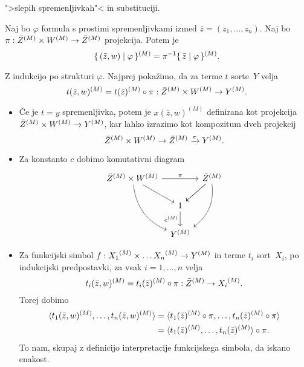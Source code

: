 \documentclass[../kategoricna_logika.tex]{subfiles}
\begin{document}
">slepih spremenljivkah"< in substituciji.
\begin{lema}\label{lema:slepe-spremenljivke}
  Naj bo $\varphi$ formula s prostimi spremenljivkami izmed
  $\bar{z} = (z_1, \ldots, z_n)$.  Naj bo
  $\pi : \bar{Z}^{(M)} \times W^{(M)} \to {\bar{Z}}^{(M)}$
  projekcija. Potem je
  $$\lbrace\,(\bar{z}, w)  \mid  \varphi\,\rbrace^{(M)} = \pi^{-1} \lbrace\,\bar{z}  \mid  \varphi\,\rbrace^{(M)}.$$
\end{lema}
\begin{dokaz}
  Z indukcijo po strukturi $\varphi$.  Najprej pokažimo, da za terme
  $t$ sorte~$Y$ velja
  $$t(\bar{z}, w)^{(M)} = t(\bar{z})^{(M)} \circ \pi : {\bar{Z}}^{(M)} \times W^{(M)} \to {Y}^{(M)}.$$
  \begin{itemize}
  \item Če je $t = y$ spremenljivka, potem je $x(\bar{z},w)^{(M)}$
    definirana kot projekcija
    ${\bar{Z}}^{(M)} \times {W}^{(M)} \to Y^{(M)}$, kar lahko
    izrazimo kot kompozitum dveh projekcij
      $${\bar{Z}}^{(M)} \times {W}^{(M)} \to \bar{Z}^{(M)} \xrightarrow{\pi} Y^{(M)}.$$

    \item Za konstanto $c$ dobimo komutativni diagram
      \begin{equation*}
        \begin{tikzcd}[column sep=tiny]
          \bar{Z}^{(M)} \times \interp{W} \ar[ddr, bend right] \ar[dr]
          \ar[rr, "\pi"] & &
          \bar{Z}^{(M)} \ar[dl] \ar[dl] \ar[ddl, bend left] \\
          & 1 \ar[d, "c^{(M)}"'] & \\
          & Y^{(M)} &
        \end{tikzcd}
      \end{equation*}
    
    \item Za funkcijski simbol
      $f : {X_1}^{(M)} \times \ldots {X_n}^{(M)} \to {Y}^{(M)}$ in
      terme $t_i$ sort~$X_i$, po indukcijski predpostavki, za vsak
      $i = 1, \ldots, n$ velja
      \[t_i(\bar{z},w)^{(M)} = t_i(\bar{z})^{(M)} \circ \pi :
        {\bar{Z}}^{(M)} \to {X_i}^{(M)}.\] Torej dobimo
      \begin{align*}
        \langle t_1(\bar{z}, w)^{(M)}, \ldots, t_n(\bar{z}, w)^{(M)} \rangle &= \langle t_1(\bar{z})^{(M)} \circ \pi, \ldots, t_n(\bar{z})^{(M)} \circ \pi \rangle \\
                                                                     &= \langle t_1(\bar{z})^{(M)}, \ldots, t_n(\bar{z})^{(M)} \rangle \circ \pi.
      \end{align*}
      To nam, skupaj z definicijo interpretacije funkcijskega simbola,
      da iskano enakost.


\end{itemize}
\end{dokaz}
\end{document}
